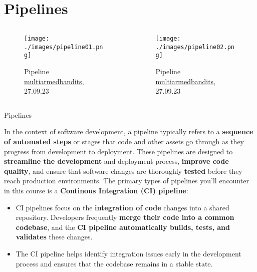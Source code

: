 \section{Pipelines}


\begin{frame}
    \begin{columns}
        \begin{column}{0.5\textwidth}
            \begin{figure}    
                \texttt{[image: ./images/pipeline01.png]}
                \caption{Pipeline \href{https://gitlab.com/aferdina/MultiArmedBandits}{multiarmedbandits}, 27.09.23} 
            \end{figure}
        \end{column}
        \begin{column}{0.5\textwidth}
            \begin{figure}    
                \texttt{[image: ./images/pipeline02.png]}
                \caption{Pipeline \href{https://gitlab.com/aferdina/MultiArmedBandits}{multiarmedbandits}, 27.09.23}
            \end{figure}
          \end{column}
        \end{columns}
\end{frame}
\begin{frame}
    \begin{content}{Pipelines}
        
In the context of software development, a pipeline typically refers to a \textbf{sequence of automated steps} or stages that code and other assets go through as they progress from development to deployment. These pipelines are designed to \textbf{streamline the development} and deployment process, \textbf{improve code quality}, and ensure that software changes are thoroughly \textbf{tested} before they reach production environments. The primary types of pipelines you'll encounter in this course is a \textbf{Continous Integration (CI) pipeline}:
\begin{itemize}
    \item CI pipelines focus on the \textbf{integration of code} changes into a shared repository. Developers frequently \textbf{merge their code into a common codebase}, and the \textbf{CI pipeline automatically builds, tests, and validates} these changes.
    \item The CI pipeline helps identify integration issues early in the development process and ensures that the codebase remains in a stable state.
\end{itemize}
    \end{content}
\end{frame}
